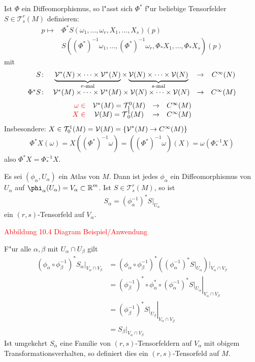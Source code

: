 Ist $\Phi$ ein Diffeomorphismus, so l"asst sich $\Phi^{*}$ f"ur beliebige Tensorfelder $S \in \mathcal T_s^r(M)$ definieren:
	\[ \begin{array}{rl} p \mapsto& \Phi^{*}S (\omega_1,\ldots,\omega_r,X_1,\ldots,X_s)(p)\\
		& S((\Phi^{*})^{-1}\omega_1, \ldots, (\Phi^{*})^{-1}\omega_{r}, \Phi_{*}X_1,\ldots,\Phi_{*}X_s)(p) \end{array} \]
mit
	\[ \begin{array}{rccc} S \colon& \underbrace{\mathcal V^{*}(N) \times \cdots \times \mathcal V^{*}(N)}_{r\text{-mal}} \times \underbrace{ \mathcal V(N) \times \cdots \times \mathcal V(N)}_{s\text{-mal}} &\to& C^{\infty}(N)\\
		\Phi^*S \colon& \mathcal V^{*}(M) \times \cdots \times \mathcal V^{*}(M) \times \mathcal V(N) \times \cdots \times \mathcal V(N) &\to& C^{\infty}(M) \end{array} \]
	\[ \begin{array}{rccc} \textcolor{red}{\omega \in}& \mathcal V^{*}(M) = \mathcal T_1^0(M) &\to& C^{\infty}(M)\\
		\textcolor{red}{X \in}& \mathcal V(M) = \operatorname{\mathcal{T}}_0^1(M) &\to& C^{\infty}(M) \end{array} \]
Insbesondere: $X \in \mathcal T_0^1(M) = \mathcal V(M) = \{\operatorname{\mathcal{V}}^*(M) \to C^{\infty}(M)\}$
\begin{align*}
  \Phi^{*}X(\omega) = X((\Phi^{*})^{-1}\omega) = ((\Phi^{*})^{-1}\omega)(X) = \omega(\Phi_{*}^{-1}X)
\end{align*}
also $\Phi^{*}X = \Phi_{*}^{-1}X$.

\begin{bsp}[Anwendung]
  Es sei $(\phi_{\alpha},U_{\alpha})$ ein Atlas von $M$. Dann ist jedes $\phi_{\alpha}$ ein Diffeomorphismus von $U_{\alpha}$ auf $\phi_{\alpha}(U_{\alpha}) = V_{\alpha} \subset \R^m$. Ist $S \in \mathcal T_s^r(M)$, so ist
  \begin{align*}
    S_{\alpha} = (\phi_{\alpha}^{-1})^{*}S|_{U_\alpha}
  \end{align*}
  ein $(r,s)$-Tensorfeld auf $V_{\alpha}$.

  \textcolor{red}{Abbildung 10.4 Diagram Beispiel/Anwendung}

  F"ur alle $\alpha, \beta$ mit $U_{\alpha} \cap U_{\beta}$ gilt
  \begin{align*}
    (\phi_{\alpha} \circ \phi_{\beta}^{-1})^{*}S_{\alpha}|_{V_{\alpha} \cap V_{\beta}} & = (\phi_{\alpha} \circ \phi_{\beta}^{-1})^{*}\left((\phi_{\alpha}^{-1})^{*}S|_{U_{\alpha}}\right)|_{V_{\alpha}\cap V_{\beta}}\\
    & = \left.(\phi_{\beta}^{-1})^{*} \circ \phi_{\alpha}^{*} \circ (\phi_{\alpha}^{-1})^{*} S|_{U_{\alpha}}\right|_{V_{\alpha} \cap V_{\beta}}\\
    & = \left.(\phi_{\beta}^{-1})^{*}S|_{U_{\beta}}\right|_{V_{\alpha} \cap V_{\beta}}\\
    & = S_{\beta}|_{V_{\alpha} \cap V_{\beta}}
  \end{align*}
  Ist umgekehrt $S_\alpha$ eine Familie von $(r,s)$-Tensorfeldern auf $V_{\alpha}$ mit obigem Transformationsverhalten, so definiert dies ein $(r,s)$-Tensorfeld auf $M$.
\end{bsp}

